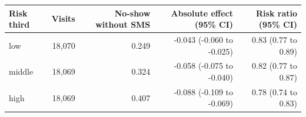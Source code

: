 \begin{tabular}{lrrrr}
\toprule
Risk third & Visits & No-show without SMS & Absolute effect (95\% CI) & Risk ratio (95\% CI) \\
\midrule
low & 18,070 & 0.249 & -0.043 (-0.060 to -0.025) & 0.83 (0.77 to 0.89) \\
middle & 18,069 & 0.324 & -0.058 (-0.075 to -0.040) & 0.82 (0.77 to 0.87) \\
high & 18,069 & 0.407 & -0.088 (-0.109 to -0.069) & 0.78 (0.74 to 0.83) \\
\bottomrule
\end{tabular}
